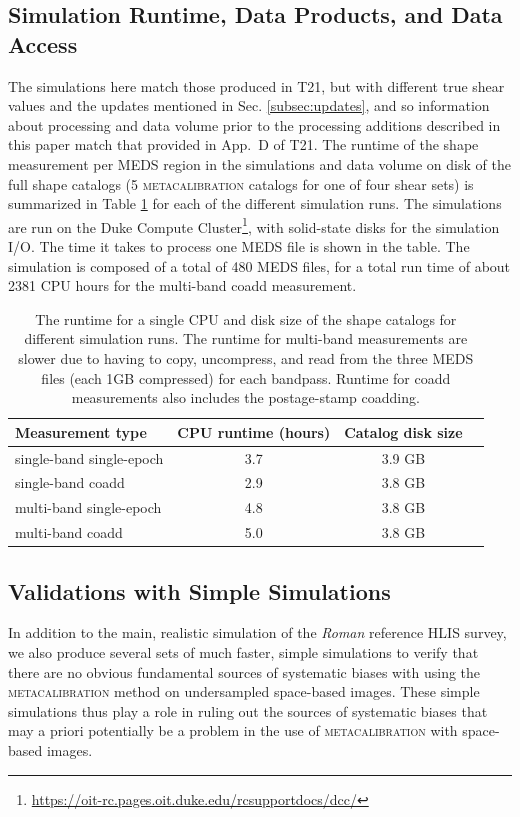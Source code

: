 \documentclass[fleqn,usenatbib]{mnras}
\begin{document}
\subsection{Simulation Runtime, Data Products, and Data Access}
The simulations here match those produced in T21, but with different true shear values and the updates mentioned in Sec. \ref{subsec:updates}, and so information about processing and data volume prior to the processing additions described in this paper match that provided in App.~D of T21.
The runtime of the shape measurement per MEDS region in the simulations and data volume on disk of the full shape catalogs (5 \textsc{metacalibration} catalogs for one of four shear sets) is summarized in Table \ref{tab:data} for each of the different simulation runs. The simulations are run on the Duke Compute Cluster\footnote{\url{https://oit-rc.pages.oit.duke.edu/rcsupportdocs/dcc/}}, with solid-state disks for the simulation I/O. The time it takes to process one MEDS file is shown in the table. The simulation is composed of a total of 480 MEDS files, for a total run time of about 2381 CPU hours for the multi-band coadd measurement.

\begin{table}
    \centering
    \begin{tabular}[width=\columnwidth]{l|c|c|c}
    \hline
    Measurement type &  CPU runtime (hours) & Catalog disk size  \\
    \hline 
    single-band single-epoch  & 3.7 & 3.9 GB \\
    single-band coadd  & 2.9 & 3.8 GB \\
    multi-band single-epoch  & 4.8 & 3.8 GB \\
    multi-band coadd  & 5.0 & 3.8 GB \\
    \hline
    \end{tabular}
    \caption{The runtime for a single CPU and disk size of the shape catalogs for different simulation runs. The runtime for multi-band measurements are slower due to having to copy, uncompress, and read from the three MEDS files (each 1GB compressed) for each bandpass. Runtime for coadd measurements also includes the postage-stamp coadding.}
    \label{tab:data}
\end{table}

\subsection{Validations with Simple Simulations}
\label{subsec:simplesim}
In addition to the main, realistic simulation of the \emph{Roman} reference HLIS survey, we also produce several sets of much faster, simple simulations  to verify that there are no obvious fundamental sources of systematic biases with using the \textsc{metacalibration} method on undersampled space-based images. These simple simulations thus play a role in ruling out the sources of systematic biases that may a priori  potentially be a problem in the use of \textsc{metacalibration} with space-based images. 
\end{document}
